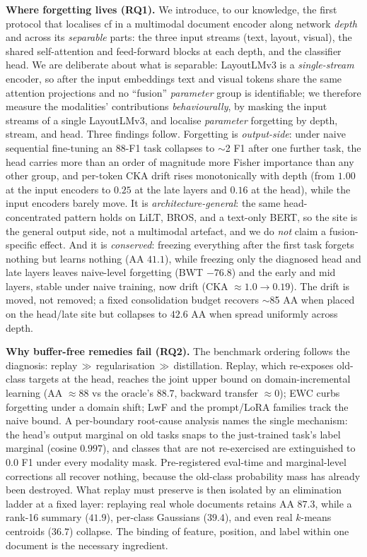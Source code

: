 \noindent\textbf{Where forgetting lives (RQ1).} We introduce, to our knowledge, the first
protocol that localises \gls{cf} in a multimodal document encoder along network \emph{depth}
and across its \emph{separable} parts: the three input streams (text, layout, visual), the
shared self-attention and feed-forward blocks at each depth, and the classifier head. We are
deliberate about what is separable: LayoutLMv3 is a \emph{single-stream} encoder, so after
the input embeddings text and visual tokens share the same attention projections and no
``fusion'' \emph{parameter} group is identifiable; we therefore measure the modalities'
contributions \emph{behaviourally}, by masking the input streams of a single LayoutLMv3, and
localise \emph{parameter} forgetting by depth, stream, and head. Three findings follow.
Forgetting is \emph{output-side}: under naive sequential fine-tuning an $88$-F1 task
collapses to $\sim$2 F1 after one further task, the head carries more than an order of
magnitude more Fisher importance than any other group, and per-token CKA drift rises
monotonically with depth (from $1.00$ at the input encoders to $0.25$ at the late layers and
$0.16$ at the head), while the input encoders barely move. It is \emph{architecture-general}:
the same head-concentrated pattern holds on LiLT, BROS, and a text-only BERT, so the site is
the general output side, not a multimodal artefact, and we do \emph{not} claim a
fusion-specific effect. And it is \emph{conserved}: freezing everything after the first task
forgets nothing but learns nothing (AA $41.1$), while freezing only the diagnosed head and
late layers leaves naive-level forgetting (BWT $-76.8$) and the early and mid layers, stable
under naive training, now drift (CKA $\approx 1.0 \rightarrow 0.19$). The drift is moved, not
removed; a fixed consolidation budget recovers $\sim$85 AA when placed on the head/late site
but collapses to $42.6$ AA when spread uniformly across depth.

\noindent\textbf{Why buffer-free remedies fail (RQ2).} The benchmark ordering follows the
diagnosis: replay\,$\gg$\,regularisation\,$\gg$\,distillation. Replay, which re-exposes
old-class targets at the head, reaches the joint upper bound on domain-incremental learning
(AA $\approx 88$ vs the oracle's $88.7$, backward transfer $\approx 0$); EWC curbs forgetting
under a domain shift; LwF and the prompt/LoRA families track the naive bound. A per-boundary
root-cause analysis names the single mechanism: the head's output marginal on old tasks snaps
to the just-trained task's label marginal (cosine $0.997$), and classes that are not
re-exercised are extinguished to $0.0$ F1 under every modality mask. Pre-registered eval-time
and marginal-level corrections all recover nothing, because the old-class probability mass has
already been destroyed. What replay must preserve is then isolated by an elimination ladder at
a fixed layer: replaying real whole documents retains AA $87.3$, while a rank-16 summary
($41.9$), per-class Gaussians ($39.4$), and even real $k$-means centroids ($36.7$) collapse.
The binding of feature, position, and label within one document is the necessary ingredient.

